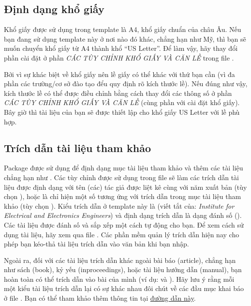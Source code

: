\subsection{Định dạng khổ giấy}

Khổ giấy được sử dụng trong template là A4, khổ giấy chuẩn của châu Âu. Nếu bạn đang sử dụng template này ở nơi nào đó khác, chẳng hạn như Mỹ, thì bạn sẽ muốn chuyển khổ giấy từ A4 thành khổ ``US Letter''. Để làm vậy, hãy thay đổi phần cài đặt ở phần \emph{CÁC TÙY CHỈNH KHỔ GIẤY VÀ CĂN LỀ} trong file .

Bởi vì sự khác biệt về khổ giấy nên lề giấy có thể khác với thứ bạn cần (vì đa phần các trường/cơ sở đào tạo đểu quy định rõ kích thước lề). Nếu đúng như vậy, kích thước lề có thể được điều chỉnh bằng cách thay đổi các thông số ở phần \emph{CÁC TÙY CHỈNH KHỔ GIẤY VÀ CĂN LỀ} (cùng phần với cài đặt khổ giấy). Bây giờ thì tài liệu của bạn sẽ được thiết lập cho khổ giấy US Letter với lề phù hợp.


\subsection{Trích dẫn tài liệu tham khảo}

Package  được sử dụng để định dạng mục tài liệu tham khảo và thêm các tài liệu chẳng hạn như \cite{Reference1}. Các tùy chỉnh được sử dụng trong file  sẽ làm các trích dẫn tài liệu được định dạng với tên (các) tác giả được liệt kê cùng với năm xuất bản (tùy chọn ), hoặc là chỉ hiện một số tương ứng với trích dẫn trong mục tài liệu tham khảo (tùy chọn ). Kiểu trích dẫn ở template này là  (viết tắt của: \textit{Institute for Electrical and Electronics Engineers}) và định dạng trích dẫn là dạng đánh số (). Các tài liệu được đánh số và sắp xếp một cách tự động cho bạn. Để xem cách sử dụng tài liệu, hãy xem qua file . Các phần mềm quản lý trích dẫn hiện nay cho phép bạn kéo-thả tài liệu trích dẫn vào văn bản khi bạn nhập.

Ngoài ra, đối với các tài liệu trích dẫn khác ngoài bài báo (article), chẳng hạn như sách (book), kỷ yếu (inproceedings), hoặc tài liệu hướng dẫn (manual), bạn hoàn toàn có thể trích dẫn vào bài của mình (ví dụ: \cite{Reference4} và \cite{Reference5}). Hãy lưu ý rằng mỗi một kiểu tài liệu trích dẫn lại có sự khác nhau đôi chút về các đầu mục khai báo ở file . Bạn có thể tham khảo thêm thông tin tại \href{https://www.bibtex.com/e/entry-types/#manual}{đường dẫn này}. 

